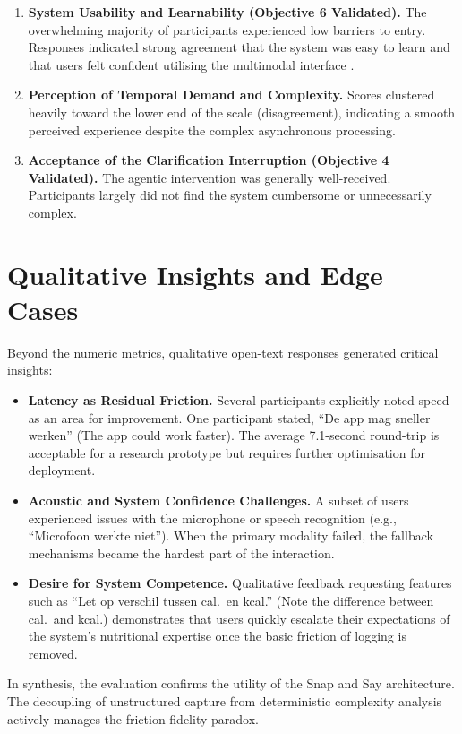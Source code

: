 \begin{enumerate}
    \item \textbf{System Usability and Learnability (Objective 6 Validated).} The overwhelming majority of participants experienced low barriers to entry. Responses indicated strong agreement that the system was easy to learn and that users felt confident utilising the multimodal interface \citep{wildenbosAgingBarriersInfluencing2018}.

    \item \textbf{Perception of Temporal Demand and Complexity.} Scores clustered heavily toward the lower end of the scale (disagreement), indicating a smooth perceived experience despite the complex asynchronous processing.

    \item \textbf{Acceptance of the Clarification Interruption (Objective 4 Validated).} The agentic intervention was generally well-received. Participants largely did not find the system cumbersome or unnecessarily complex.
\end{enumerate}

\section{Qualitative Insights and Edge Cases}

Beyond the numeric metrics, qualitative open-text responses generated critical insights:

\begin{itemize}
    \item \textbf{Latency as Residual Friction.} Several participants explicitly noted speed as an area for improvement. One participant stated, ``De app mag sneller werken'' (The app could work faster). The average 7.1-second round-trip is acceptable for a research prototype \citep{nahStudyTolerableWaiting2004} but requires further optimisation for deployment.

    \item \textbf{Acoustic and System Confidence Challenges.} A subset of users experienced issues with the microphone or speech recognition (e.g., ``Microfoon werkte niet''). When the primary modality failed, the fallback mechanisms became the hardest part of the interaction.

    \item \textbf{Desire for System Competence.} Qualitative feedback requesting features such as ``Let op verschil tussen cal.\ en kcal.'' (Note the difference between cal.\ and kcal.) demonstrates that users quickly escalate their expectations of the system's nutritional expertise once the basic friction of logging is removed.
\end{itemize}

In synthesis, the evaluation confirms the utility of the Snap and Say architecture. The decoupling of unstructured capture from deterministic complexity analysis actively manages the friction-fidelity paradox.

